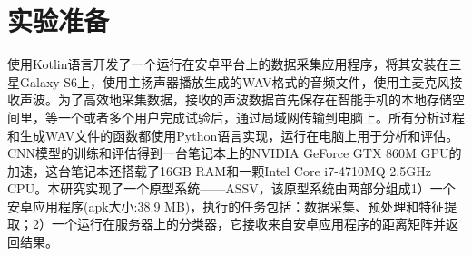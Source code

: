 \section{实验准备}
使用Kotlin语言开发了一个运行在安卓平台上的数据采集应用程序，将其安装在三星Galaxy S6上，使用主扬声器播放生成的WAV格式的音频文件，使用主麦克风接收声波。为了高效地采集数据，接收的声波数据首先保存在智能手机的本地存储空间里，等一个或者多个用户完成试验后，通过局域网传输到电脑上。所有分析过程和生成WAV文件的函数都使用Python语言实现，运行在电脑上用于分析和评估。CNN模型的训练和评估得到一台笔记本上的NVIDIA GeForce GTX 860M GPU的加速，这台笔记本还搭载了16GB RAM和一颗Intel Core i7-4710MQ 2.5GHz CPU。本研究实现了一个原型系统——ASSV，该原型系统由两部分组成1）一个安卓应用程序(apk大小:38.9 MB)，执行的任务包括：数据采集、预处理和特征提取；2）一个运行在服务器上的分类器，它接收来自安卓应用程序的距离矩阵并返回结果。

